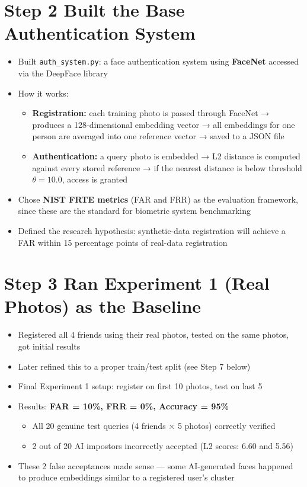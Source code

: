 \documentclass[11pt,a4paper]{article}
\begin{document}
\section*{Step 2 \quad Built the Base Authentication System}

\begin{itemize}
    \item Built \texttt{auth\_system.py}: a face authentication system using \textbf{FaceNet} accessed via the DeepFace library
    \item How it works:
    \begin{itemize}
        \item \textbf{Registration:} each training photo is passed through FaceNet → produces a 128-dimensional embedding vector → all embeddings for one person are averaged into one reference vector → saved to a JSON file
        \item \textbf{Authentication:} a query photo is embedded → L2 distance is computed against every stored reference → if the nearest distance is below threshold $\theta = 10.0$, access is granted
    \end{itemize}
    \item Chose \textbf{NIST FRTE metrics} (FAR and FRR) as the evaluation framework, since these are the standard for biometric system benchmarking
    \item Defined the research hypothesis: synthetic-data registration will achieve a FAR within 15 percentage points of real-data registration
\end{itemize}

\section*{Step 3 \quad Ran Experiment 1 (Real Photos) as the Baseline}

\begin{itemize}
    \item Registered all 4 friends using their real photos, tested on the same photos, got initial results
    \item Later refined this to a proper train/test split (see Step 7 below)
    \item Final Experiment 1 setup: register on first 10 photos, test on last 5
    \item Results: \textbf{FAR = 10\%, FRR = 0\%, Accuracy = 95\%}
    \begin{itemize}
        \item All 20 genuine test queries (4 friends × 5 photos) correctly verified
        \item 2 out of 20 AI impostors incorrectly accepted (L2 scores: 6.60 and 5.56)
    \end{itemize}
    \item These 2 false acceptances made sense — some AI-generated faces happened to produce embeddings similar to a registered user's cluster
\end{itemize}
\end{document}
